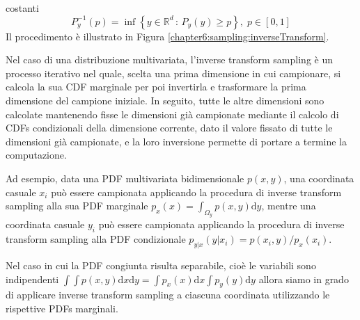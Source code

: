 costanti
\begin{equation}
	P_y^{-1}(p)=\inf\left\{y\in\mathbb{R}^d\,:\,P_y(y)\geq p\right\},\;p\in[0,1]
\end{equation}
Il procedimento \`e illustrato in Figura \ref{chapter6:sampling:inverseTransform}.\par
Nel caso di una distribuzione multivariata, l'inverse transform sampling \`e un processo iterativo nel quale, scelta una prima dimensione in cui
campionare, si calcola la sua CDF marginale per poi invertirla e trasformare la prima dimensione del campione iniziale. In seguito, tutte le 
altre dimensioni sono calcolate mantenendo fisse le dimensioni gi\`a campionate mediante il calcolo di CDFs condizionali della dimensione corrente, 
dato il valore fissato di tutte le dimensioni gi\`a campionate, e la loro inversione permette di portare a termine la computazione.\par
Ad esempio, data una PDF multivariata bidimensionale $p(x,y)$, una coordinata casuale $x_i$ pu\`o essere campionata applicando la procedura di 
inverse transform sampling alla sua PDF marginale $p_x(x)=\int_{\Omega_y}p(x,y)\mathrm{d}y$, mentre una coordinata casuale $y_i$ pu\`o essere 
campionata applicando la procedura di inverse transform sampling alla PDF condizionale $p_{y|x}(y|x_i)=p(x_i,y) / p_x(x_i)$.\par
Nel caso in cui la PDF congiunta risulta separabile, cio\`e le variabili sono indipendenti 
\mbox{$\int\int p(x,y)\mathrm{d}x\mathrm{d}y=\int p_x(x)\mathrm{d}x\int p_y(y)\mathrm{d}y$} allora siamo in grado di applicare inverse transform 
sampling a ciascuna coordinata utilizzando le rispettive PDFs marginali.
